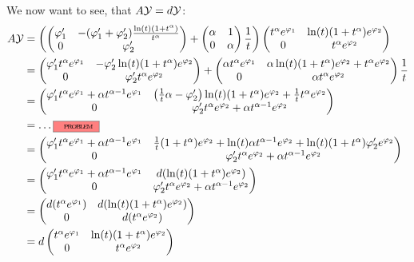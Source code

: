 We now want to see, that $A\mathcal{Y}=d\mathcal{Y}$:
\begin{align*}
  A\cY&=\left( \begin{pmatrix}
    \phi_1' & -(\phi_1'+\phi_2')\frac{\ln(t)(1+t^\alpha)}{t^\alpha}
    \\0 & \phi_2'
  \end{pmatrix} 
  +
  \begin{pmatrix} \alpha & 1 \\ 0 & \alpha \end{pmatrix} \frac{1}{t}
  \right)
  \begin{pmatrix}
    t^\alpha e^{\phi_1} & \ln(t)(1+t^\alpha)e^{\phi_2}
    \\0 & t^\alpha e^{\phi_2}
  \end{pmatrix}
  \\&=\begin{pmatrix}
    \phi_1' t^\alpha e^{\phi_1} & -\phi_2'\ln(t)(1+t^\alpha) e^{\phi_2}
    \\0 & \phi_2' t^\alpha e^{\phi_2}
  \end{pmatrix}
  +
  \begin{pmatrix}
    \alpha t^\alpha e^{\phi_1} &
    \alpha\ln(t)(1+t^\alpha)e^{\phi_2} + t^\alpha e^{\phi_2}
    \\0 & \alpha t^\alpha e^{\phi_2}
  \end{pmatrix}
  \frac{1}{t}
  \\&=\begin{pmatrix}
    \phi_1' t^\alpha e^{\phi_1} +\alpha t^{\alpha-1} e^{\phi_1}
    &
    \left(\frac{1}{t}\alpha -\phi_2'\right) \ln(t)(1+t^\alpha)e^{\phi_2}
    +\frac{1}{t} t^\alpha e^{\phi_2}
    \\0 & \phi_2' t^\alpha e^{\phi_2}+\alpha t^{\alpha-1} e^{\phi_2}
  \end{pmatrix}
  \\&=\dots\PROBLEM
  \\&=\begin{pmatrix}
    \phi_1' t^\alpha e^{\phi_1} +\alpha t^{\alpha-1} e^{\phi_1} 
    &
    \frac{1}{t}(1+t^\alpha)e^{\phi_2}
    +\ln(t)\alpha t^{\alpha-1}e^{\phi_2}
    +\ln(t)(1+t^\alpha)\phi_2'e^{\phi_2}
    \\0 & \phi_2' t^\alpha e^{\phi_2}+\alpha t^{\alpha-1} e^{\phi_2}
  \end{pmatrix}
  \\&=\begin{pmatrix}
    \phi_1' t^\alpha e^{\phi_1} +\alpha t^{\alpha-1} e^{\phi_1} 
    &
    d(\ln(t)(1+t^\alpha)e^{\phi_2})
    \\0 & \phi_2' t^\alpha e^{\phi_2}+\alpha t^{\alpha-1} e^{\phi_2}
  \end{pmatrix}
  \\&=\begin{pmatrix}
    d(t^\alpha e^{\phi_1}) & d(\ln(t)(1+t^\alpha)e^{\phi_2})
    \\0 & d(t^\alpha e^{\phi_2})
  \end{pmatrix}
  \\&=d\begin{pmatrix}
    t^\alpha e^{\phi_1} & \ln(t)(1+t^\alpha)e^{\phi_2}
    \\0 & t^\alpha e^{\phi_2}
  \end{pmatrix}
\end{align*}
